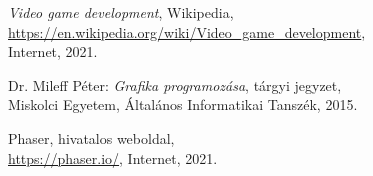 
\begin{thebibliography}{x}

	\emph{Video game development}, Wikipedia, \\
	\url{https://en.wikipedia.org/wiki/Video_game_development}, \\
	Internet, 2021.
	
	Dr. Mileff Péter: \emph{Grafika programozása}, tárgyi jegyzet, \\
	Miskolci Egyetem, Általános Informatikai Tanszék, 2015.
	
	Phaser, hivatalos weboldal, \\
	\url{https://phaser.io/},
	Internet, 2021.


\end{thebibliography}

